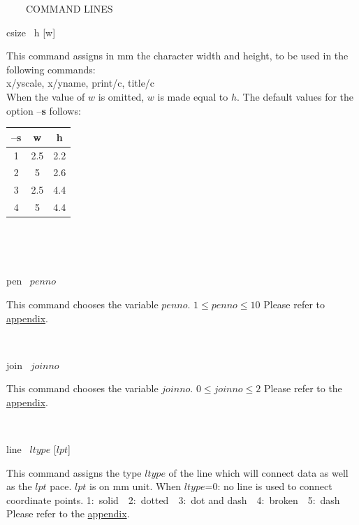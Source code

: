 \begin{qsection}{\ ~~~COMMAND LINES}
\begin{minipage}[t]{5.5cm}
csize ~h [w]
\end{minipage}
\begin{minipage}[t]{9cm}
This command assigns in mm the character width and height,
to be used in the following commands:\\
x/yscale, x/yname, print/c, title/c\\
When the value of $w$ is omitted, $w$ is made equal to $h$.
The default values for the option --{\bf s} follows:
\begin{tabular}{ccc}

--{\bf s} &w &h  \\ \hline
1 &2.5 &2.2\\
2&5&2.6\\
3&2.5&4.4\\
4&5&4.4
\end{tabular}\\

\end{minipage}\\

\begin{minipage}[t]{5.5cm}
 pen ~$penno$
\end{minipage}
\begin{minipage}[t]{9cm}
This command chooses the variable $penno$.
$1 \leq  penno \leq 10$
Please refer to \hyperlink{pen-color}{appendix}.
\end{minipage}\\

\begin{minipage}[t]{5.5cm}
 join ~$joinno$
\end{minipage}
\begin{minipage}[t]{9cm}
This command chooses the variable $joinno$.
$0 \leq joinno \leq 2$
Please refer to the \hyperlink{join-type}{appendix}.
\end{minipage}\\

\begin{minipage}[t]{5.5cm}
line ~$ltype$ [$lpt$]
\end{minipage}
\begin{minipage}[t]{9cm}
This command assigns the type $ltype$ of the line which will connect
data as well as the $lpt$ pace. $lpt$ is on mm unit.
When $ltype$=0: no line is used to connect coordinate points.
1:~solid~~2:~dotted~~3:~dot and dash~~4:~broken~~5:~dash
Please refer to the \hyperlink{pen-line}{appendix}.\\
        

\end{minipage}
\end{qsection}
